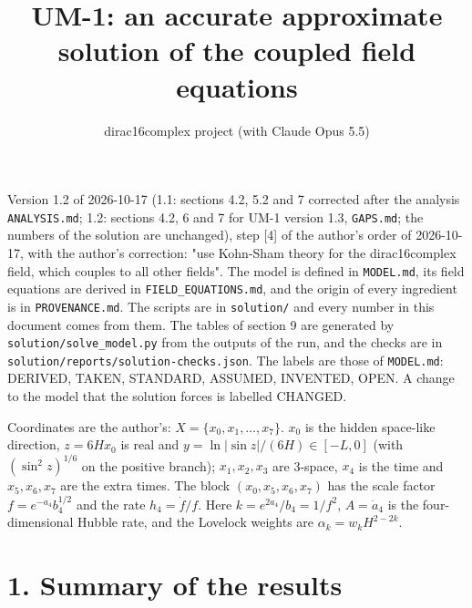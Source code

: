 \documentclass[11pt]{article}
\title{UM-1: an accurate approximate solution of the coupled field equations}
\author{dirac16complex project (with Claude Opus 5.5)}
\date{}
\begin{document}
\maketitle
\tableofcontents
\newpage

Version 1.2 of 2026-10-17 (1.1: sections 4.2, 5.2 and 7 corrected after the analysis \texttt{ANALYSIS.\allowbreak{}md}; 1.2: sections 4.2, 6 and 7 for UM-1 version 1.3, \texttt{GAPS.\allowbreak{}md}; the numbers of the solution are unchanged), step [4] of the author's order of 2026-10-17, with the author's correction: "use Kohn-Sham theory for the dirac16complex field, which couples to all other fields". The model is defined in \texttt{MODEL.\allowbreak{}md}, its field equations are derived in \texttt{FIELD\_\allowbreak{}EQUATIONS.\allowbreak{}md}, and the origin of every ingredient is in \texttt{PROVENANCE.\allowbreak{}md}. The scripts are in \texttt{solution/\allowbreak{}} and every number in this document comes from them. The tables of section 9 are generated by \texttt{solution/\allowbreak{}solve\_\allowbreak{}model.\allowbreak{}py} from the outputs of the run, and the checks are in \texttt{solution/\allowbreak{}reports/\allowbreak{}solution-{}\allowbreak{}checks.\allowbreak{}json}. The labels are those of \texttt{MODEL.\allowbreak{}md}: DERIVED, TAKEN, STANDARD, ASSUMED, INVENTED, OPEN. A change to the model that the solution forces is labelled CHANGED.

Coordinates are the author's: $X = \{x_0, x_1, \dots, x_7\}$. $x_0$ is the hidden space-like direction, $z = 6Hx_0$ is real and $y = \ln|\sin z|/(6H) \in [-L, 0]$ (with $(\sin^2 z)^{1/6}$ on the positive branch); $x_1, x_2, x_3$ are 3-space, $x_4$ is the time and $x_5, x_6, x_7$ are the extra times. The block $(x_0, x_5, x_6, x_7)$ has the scale factor $f = e^{-a_4}b_4^{1/2}$ and the rate $h_4 = \dot f/f$. Here $k = e^{2a_4}/b_4 = 1/f^2$, $A = \dot a_4$ is the four-dimensional Hubble rate, and the Lovelock weights are $\alpha_k = w_kH^{2-2k}$.

\section*{1. Summary of the results}
\end{document}
